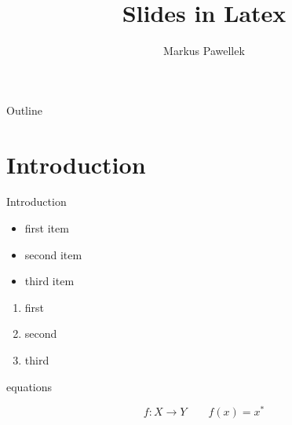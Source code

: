 \documentclass[aspectratio=169]{beamer}
\title{Slides in Latex}
\author{Markus Pawellek}
\begin{document}
  \frame{\titlepage}

  \begin{frame}{Outline}
    \footnotesize
    \hfill\parbox[t][7cm][l]{0.9\textwidth}{\tableofcontents}
  \end{frame}

  \section{Introduction}
    \begin{frame}{Introduction}
      \begin{itemize}
        \item first item
        \item second item
        \pause
        \item third item
      \end{itemize}
    \end{frame}

    \begin{frame}
      \begin{enumerate}
        \item first
        \pause
        \item second
        \item third
      \end{enumerate}
    \end{frame}

    \begin{frame}{equations}
      \begin{mybox}
        \[
          f\colon X\to Y
          \qquad
          f(x) = x^*
        \]
      \end{mybox}
    \end{frame}
\end{document}
